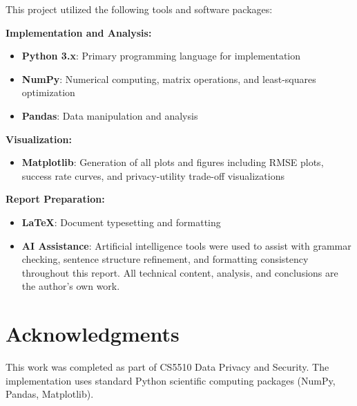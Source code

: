 \documentclass[11pt,letterpaper]{article}
\begin{document}
This project utilized the following tools and software packages:

\textbf{Implementation and Analysis:}
\begin{itemize}[leftmargin=*]
    \item \textbf{Python 3.x}: Primary programming language for implementation
    \item \textbf{NumPy}: Numerical computing, matrix operations, and least-squares optimization
    \item \textbf{Pandas}: Data manipulation and analysis
\end{itemize}

\textbf{Visualization:}
\begin{itemize}[leftmargin=*]
    \item \textbf{Matplotlib}: Generation of all plots and figures including RMSE plots, success rate curves, and privacy-utility trade-off visualizations
\end{itemize}

\textbf{Report Preparation:}
\begin{itemize}[leftmargin=*]
    \item \textbf{\LaTeX}: Document typesetting and formatting
    \item \textbf{AI Assistance}: Artificial intelligence tools were used to assist with grammar checking, sentence structure refinement, and formatting consistency throughout this report. All technical content, analysis, and conclusions are the author's own work.
\end{itemize}

\section*{Acknowledgments}

This work was completed as part of CS5510 Data Privacy and Security. The implementation uses standard Python scientific computing packages (NumPy, Pandas, Matplotlib).
\end{document}
